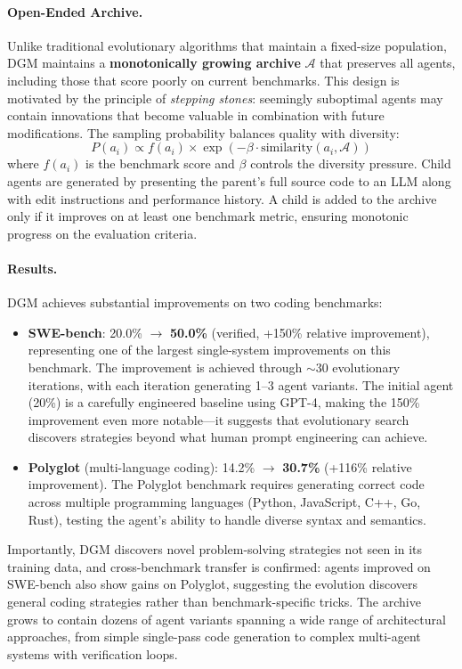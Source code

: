 \paragraph{Open-Ended Archive.}
Unlike traditional evolutionary algorithms that maintain a fixed-size population, DGM maintains a \textbf{monotonically growing archive} $\mathcal{A}$ that preserves all agents, including those that score poorly on current benchmarks. This design is motivated by the principle of \emph{stepping stones}: seemingly suboptimal agents may contain innovations that become valuable in combination with future modifications. The sampling probability balances quality with diversity:
\begin{equation}
P(a_i) \propto f(a_i) \times \exp\left(-\beta \cdot \text{similarity}(a_i, \mathcal{A})\right)
\end{equation}
where $f(a_i)$ is the benchmark score and $\beta$ controls the diversity pressure. Child agents are generated by presenting the parent's full source code to an LLM along with edit instructions and performance history. A child is added to the archive only if it improves on at least one benchmark metric, ensuring monotonic progress on the evaluation criteria.

\paragraph{Results.}
DGM achieves substantial improvements on two coding benchmarks:
\begin{itemize}
    \item \textbf{SWE-bench}: 20.0\% $\rightarrow$ \textbf{50.0\%} (verified, +150\% relative improvement), representing one of the largest single-system improvements on this benchmark. The improvement is achieved through $\sim$30 evolutionary iterations, with each iteration generating 1--3 agent variants. The initial agent (20\%) is a carefully engineered baseline using GPT-4, making the 150\% improvement even more notable---it suggests that evolutionary search discovers strategies beyond what human prompt engineering can achieve.
    \item \textbf{Polyglot} (multi-language coding): 14.2\% $\rightarrow$ \textbf{30.7\%} (+116\% relative improvement). The Polyglot benchmark requires generating correct code across multiple programming languages (Python, JavaScript, C++, Go, Rust), testing the agent's ability to handle diverse syntax and semantics.
\end{itemize}
Importantly, DGM discovers novel problem-solving strategies not seen in its training data, and cross-benchmark transfer is confirmed: agents improved on SWE-bench also show gains on Polyglot, suggesting the evolution discovers general coding strategies rather than benchmark-specific tricks. The archive grows to contain dozens of agent variants spanning a wide range of architectural approaches, from simple single-pass code generation to complex multi-agent systems with verification loops.

